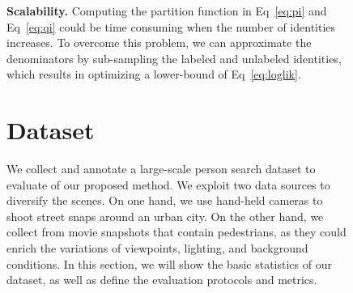 \documentclass[10pt,twocolumn,letterpaper]{article}
\begin{document}
\begin{figure}[t]
\begin{center}
\textbf{Scalability.} Computing the partition function in Eq~\eqref{eq:pi} and Eq~\eqref{eq:qi} could be time consuming when the number of identities increases. To overcome this problem, we can approximate the denominators by sub-sampling the labeled and unlabeled identities, which results in optimizing a lower-bound of Eq~\eqref{eq:loglik}.




\section{Dataset} \label{sec:dataset}
We collect and annotate a large-scale person search dataset to evaluate of our proposed method. We exploit two data sources to diversify the scenes. On one hand, we use hand-held cameras to shoot street snaps around an urban city. On the other hand, we collect from movie snapshots that contain pedestrians, as they could enrich the variations of viewpoints, lighting, and background conditions. In this section, we will show the basic statistics of our dataset, as well as define the evaluation protocols and metrics.


\end{center}
\end{figure}
\end{document}

